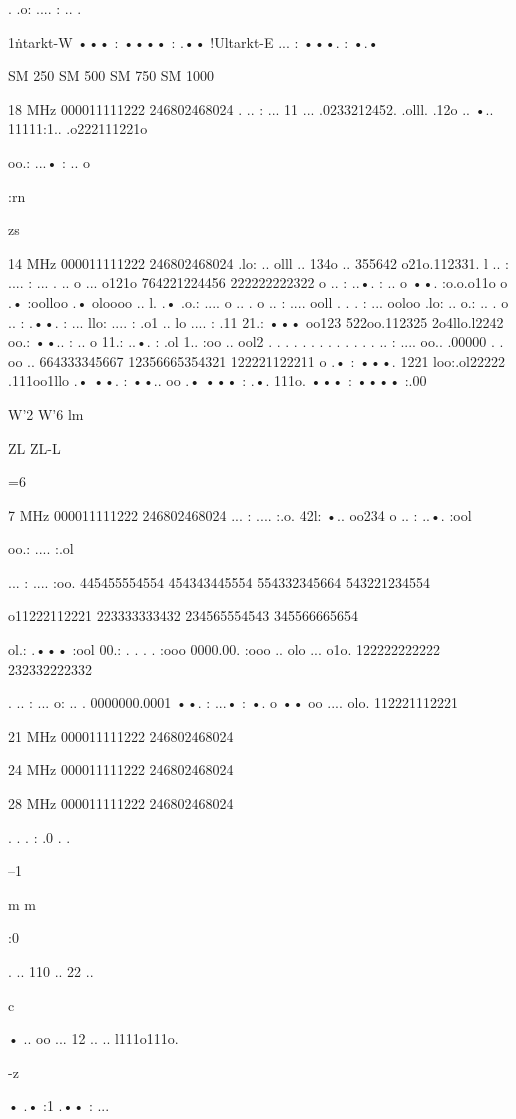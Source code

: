 \documentclass[a4paper,twoside,twocolumn,openright]{book}
\begin{document}
{{{{{{. .o: .... : .. .

1\.ntarkt-W ••• : •••• : .••
!Ultarkt-E ... : •••. : •.•

SM 250
SM 500
SM 750
SM 1000

18 MHz
000011111222
246802468024
. .. : ... 11 ...
.0233212452.
.olll. .12o ..
•.. 11111:1..
.o222111221o

oo.: ...• : .. o

:rn

zs

14 MHz
000011111222
246802468024
.lo: .. olll ..
134o .. 355642
o21o.112331.
l .. : .... : ...
. .. o ... o121o
764221224456
222222222322
o .. : ..•. : .. o
••. :o.o.o11o
o .• :oolloo .•
oloooo .. l. .•
.o.: .... o .. .
o .. : .... ooll . . . : ... ooloo .lo: .. o.: .. .
o .. : .••. : ... llo: .... : .o1 .. lo .... : .11
21.: ••• oo123 522oo.112325 2o4llo.l2242
oo.: ••.. : .. o 11.: ..•. : .ol 1.. :oo .. ool2
. . . . . . . . . . . . . .. : .... oo.. .00000 . . oo ..
664333345667 12356665354321 122221122211
o .• : •••. 1221 loo:.ol22222 .111oo1llo .•
••. : ••.. oo .• ••• : .•. 111o.
••• : •••• :.00

W'2
W'6
lm

ZL
ZL-L

=6

7 MHz
000011111222
246802468024
... : .... :.o.
42l: •.. oo234
o .. : ..•. :ool

oo.: .... :.ol

... : .... :oo.
445455554554
454343445554
554332345664
543221234554

o11222112221
223333333432
234565554543
345566665654

ol.: .••• :ool
00.: . . . . :ooo
0000.00. :ooo
.. olo ... o1o.
122222222222
232332222332

. .. : ... o: .. .
0000000.0001
••. : ...• : •. o
•• oo .... olo.
112221112221

21 MHz
000011111222
246802468024

24 MHz
000011111222
246802468024

28 MHz
000011111222
246802468024

. . . : .0 . .

--1

m
m

:0

. .. 110 .. 22 ..

c

• .. oo ... 12 ..
.. l111o111o.

-z

• .• :1 .•• : ...

}}}}}}
\end{document}
